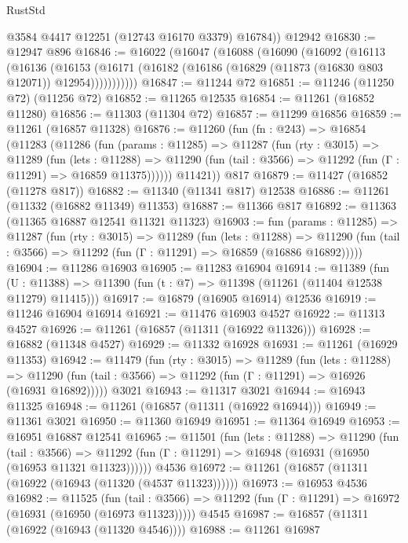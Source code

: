 \begin{lexlean}{RustStd}
\begin{coremodule}
        @3584
        @4417
        @12251
        (@12743 @16170 @3379)
        @16784))
    @12942
@16830 := @12947 @896
@16846 := @16022
    (@16047
      (@16088
        (@16090
          (@16092
            (@16113
              (@16136
                (@16153
                  (@16171 (@16182 (@16186 (@16829 (@11873 (@16830 @803 @12071)) @12954)))))))))))
@16847 := @11244 @72
@16851 := @11246 (@11250 @72) (@11256 @72)
@16852 := @11265 @12535
@16854 := @11261 (@16852 @11280)
@16856 := @11303 (@11304 @72)
@16857 := @11299 @16856
@16859 := @11261 (@16857 @11328)
@16876 := @11260
    (fun (fn : @243) =>
    @16854
      (@11283
        (@11286
          (fun (params : @11285) =>
          @11287
            (fun (rty : @3015) =>
            @11289
              (fun (lets : @11288) =>
              @11290 (fun (tail : @3566) => @11292 (fun (Γ : @11291) => @16859 @11375))))))
        @11421))
    @817
@16879 := @11427 (@16852 (@11278 @817))
@16882 := @11340 (@11341 @817) @12538
@16886 := @11261 (@11332 (@16882 @11349) @11353)
@16887 := @11366 @817
@16892 := @11363 (@11365 @16887 @12541 @11321 @11323)
@16903 := fun (params : @11285) =>
  @11287
    (fun (rty : @3015) =>
    @11289
      (fun (lets : @11288) =>
      @11290 (fun (tail : @3566) => @11292 (fun (Γ : @11291) => @16859 (@16886 @16892)))))
@16904 := @11286 @16903
@16905 := @11283 @16904
@16914 := @11389
    (fun (U : @11388) => @11390 (fun (t : @7) => @11398 (@11261 (@11404 @12538 @11279) @11415)))
@16917 := @16879 (@16905 @16914) @12536
@16919 := @11246 @16904 @16914
@16921 := @11476 @16903 @4527
@16922 := @11313 @4527
@16926 := @11261 (@16857 (@11311 (@16922 @11326)))
@16928 := @16882 (@11348 @4527)
@16929 := @11332 @16928
@16931 := @11261 (@16929 @11353)
@16942 := @11479
    (fun (rty : @3015) =>
    @11289
      (fun (lets : @11288) =>
      @11290 (fun (tail : @3566) => @11292 (fun (Γ : @11291) => @16926 (@16931 @16892)))))
    @3021
@16943 := @11317 @3021
@16944 := @16943 @11325
@16948 := @11261 (@16857 (@11311 (@16922 @16944)))
@16949 := @11361 @3021
@16950 := @11360 @16949
@16951 := @11364 @16949
@16953 := @16951 @16887 @12541
@16965 := @11501
    (fun (lets : @11288) =>
    @11290
      (fun (tail : @3566) =>
      @11292 (fun (Γ : @11291) => @16948 (@16931 (@16950 (@16953 @11321 @11323))))))
    @4536
@16972 := @11261 (@16857 (@11311 (@16922 (@16943 (@11320 (@4537 @11323))))))
@16973 := @16953 @4536
@16982 := @11525
    (fun (tail : @3566) => @11292 (fun (Γ : @11291) => @16972 (@16931 (@16950 (@16973 @11323)))))
    @4545
@16987 := @16857 (@11311 (@16922 (@16943 (@11320 @4546))))
@16988 := @11261 @16987

\end{coremodule}
\end{lexlean}
